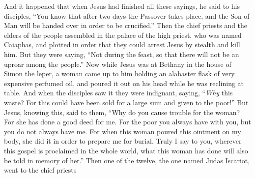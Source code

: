 \begin{biblechapter} %
 And it happened that when Jesus had finished all these sayings, he said to his disciples,
\verse “You know that after two days the Passover takes place, and the Son of Man will be handed over in order to be crucified.”
\verse Then the chief priests and the elders of the people assembled in the palace of the high priest, who was named Caiaphas,
\verse and plotted in order that they could arrest Jesus by stealth and kill him.
\verse But they were saying, “Not during the feast, so that there will not be an uproar among the people.”
 Now while Jesus was at Bethany in the house of Simon the leper,
\verse a woman came up to him holding an alabaster flask of very expensive perfumed oil, and poured it out on his head while he was reclining at table.
\verse And when the disciples saw it they were indignant, saying, “\textit{Why} this waste?
\verse For this could have been sold for a large sum and given to the poor!”
\verse But Jesus, knowing this, said to them, “Why do you cause trouble for the woman? For she has done a good deed for me.
\verse For the poor you always have with you, but you do not always have me.
\verse For when this woman poured this ointment on my body, she did it in order to prepare me for burial.
\verse Truly I say to you, wherever this gospel is proclaimed in the whole world, what this woman has done will also be told in memory of her.”
 Then one of the twelve, the one named Judas Iscariot, went to the chief priests

\end{biblechapter}

